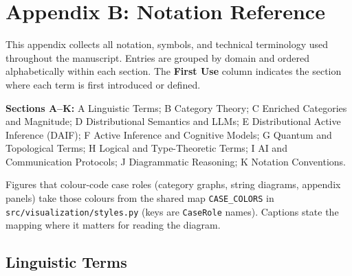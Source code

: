 \documentclass[
]{article}
\begin{document}
\newpage

\newpage

\section{Appendix B: Notation Reference}\label{sec:notation}

This appendix collects all notation, symbols, and technical terminology
used throughout the manuscript. Entries are grouped by domain and
ordered alphabetically within each section. The \textbf{First Use}
column indicates the section where each term is first introduced or
defined.

\textbf{Sections A--K:} A Linguistic Terms; B Category Theory; C
Enriched Categories and Magnitude; D Distributional Semantics and LLMs;
E Distributional Active Inference (DAIF); F Active Inference and
Cognitive Models; G Quantum and Topological Terms; H Logical and
Type-Theoretic Terms; I AI and Communication Protocols; J Diagrammatic
Reasoning; K Notation Conventions.

Figures that colour-code case roles (category graphs, string diagrams,
appendix panels) take those colours from the shared map
\texttt{CASE\_COLORS} in \texttt{src/visualization/styles.py} (keys are
\texttt{CaseRole} names). Captions state the mapping where it matters
for reading the diagram.

\subsection{Linguistic Terms}\label{sec:notation-linguistic}
\end{document}
